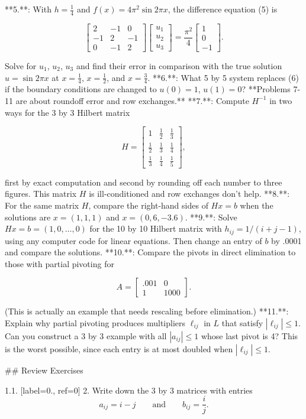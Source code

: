 

**5.**: With \(h=\frac{1}{4}\) and \(f(x)=4\pi^{2}\sin 2\pi x\), the difference equation (5) is

\[\begin{bmatrix}2&-1&0\\ -1&2&-1\\ 0&-1&2\end{bmatrix}\begin{bmatrix}u_{1}\\ u_{2}\\ u_{3}\end{bmatrix}=\frac{\pi^{2}}{4}\begin{bmatrix}1\\ 0\\ -1\end{bmatrix}.\]

Solve for \(u_{1}\), \(u_{2}\), \(u_{3}\) and find their error in comparison with the true solution \(u=\sin 2\pi x\) at \(x=\frac{1}{4}\), \(x=\frac{1}{2}\), and \(x=\frac{3}{4}\).
**6.**: What 5 by 5 system replaces (6) if the boundary conditions are changed to \(u(0)=1\), \(u(1)=0\)?
**Problems 7-11 are about roundoff error and row exchanges.**
**7.**: Compute \(H^{-1}\) in two ways for the 3 by 3 Hilbert matrix

\[H=\begin{bmatrix}1&\frac{1}{2}&\frac{1}{3}\\ \frac{1}{2}&\frac{1}{3}&\frac{1}{4}\\ \frac{1}{3}&\frac{1}{4}&\frac{1}{5}\end{bmatrix},\]

first by exact computation and second by rounding off each number to three figures. This matrix \(H\) is ill-conditioned and row exchanges don't help.
**8.**: For the same matrix \(H\), compare the right-hand sides of \(Hx=b\) when the solutions are \(x=(1,1,1)\) and \(x=(0,6,-3.6)\).
**9.**: Solve \(Hx=b=(1,0,\ldots,0)\) for the 10 by 10 Hilbert matrix with \(h_{ij}=1/(i+j-1)\), using any computer code for linear equations. Then change an entry of \(b\) by .0001 and compare the solutions.
**10.**: Compare the pivots in direct elimination to those with partial pivoting for

\[A=\begin{bmatrix}.001&0\\ 1&1000\end{bmatrix}.\]

(This is actually an example that needs rescaling before elimination.)
**11.**: Explain why partial pivoting produces multipliers \(\ell_{ij}\) in \(L\) that satisfy \(|\ell_{ij}|\leq 1\). Can you construct a 3 by 3 example with all \(|a_{ij}|\leq 1\) whose last pivot is 4? This is the worst possible, since each entry is at most doubled when \(|\ell_{ij}|\leq 1\).

## Review Exercises

1.1. [label=0., ref=0]
2. Write down the 3 by 3 matrices with entries \[a_{ij}=i-j\qquad\text{and}\qquad b_{ij}=\frac{i}{j}.\]